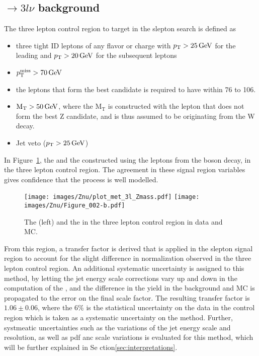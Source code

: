 \subsection*{\PWZ$\rightarrow3l\nu$ background}
\noindent
\justify
The three lepton control region to target \PWZ in the slepton search is defined as
\begin{itemize}
    \item three tight ID leptons of any flavor or charge with $p_{\mathrm{T}}>25\,\text{Ge\hspace{-.08em}V}$ for the leading and $p_{\mathrm{T}}>20\,\text{Ge\hspace{-.08em}V}$ for the subsequent leptons
    \item $p_{\mathrm{T}}^\text{miss}>70\,\text{Ge\hspace{-.08em}V}$
    \item the leptons that form the best \PZ candidate is required to have \mll within 76 to 106\GeV.
    \item $\mathrm{M_{T}}>50\,\text{Ge\hspace{-.08em}V}$, where the $\mathrm{M_{T}}$ is constructed with the lepton that does not form the best Z candidate, and is thus assumed to be originating from the W decay.
    \item Jet veto ($p_{\mathrm{T}}>25\,\text{Ge\hspace{-.08em}V}$)
\end{itemize}
In Figure~\ref{fig:WZmet}, the \ptmiss and the \mttwo constructed using the leptons from the \PZ boson decay, in the three lepton control region.
The agreement in these signal region variables gives confidence that the \PWZ process is well modelled.
\begin{figure}[htbp!]
\begin{center}
\texttt{[image: images/Znu/plot\_met\_3l\_Zmass.pdf]}
\texttt{[image: images/Znu/Figure\_002-b.pdf]}
\caption{The \ptmiss (left) and the \mttwo in the three lepton control region in data and MC. }
\label{fig:WZmet}
\end{center}
\end{figure}
From this region, a transfer factor is derived that is applied in the slepton signal region to account for the slight difference in normalization observed in the three lepton control region.
An additional systematic uncertainty is assigned to this method, by letting the jet energy scale corrections vary up and down in the computation of the \ptmiss, and the difference in the yield in the     background and \PWZ MC is propagated to the error on the final scale factor.
The resulting transfer factor is $1.06\pm0.06$, where the 6\% is the statistical uncertainty on the data in the control region which is taken as a systematic uncertainty on the method.
Further, systmeatic uncertainties such as the variations of the jet energy scale and resolution, as well as pdf anc scale variations is evaluated for this method, which will be further explained in Se    ction\ref{sec:interpretations}.

